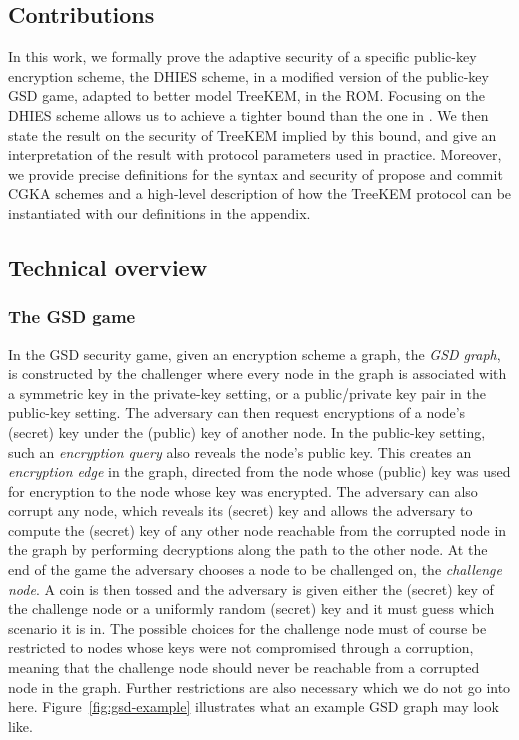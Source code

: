 \subsection{Contributions}

In this work, we formally prove the adaptive security of a specific public-key encryption scheme, the DHIES scheme, in a modified version of the public-key GSD game, adapted to better model TreeKEM, in the ROM. Focusing on the DHIES scheme allows us to achieve a tighter bound than the one in \cite{ttkem}. We then state the result on the security of TreeKEM implied by this bound, and give an interpretation of the result with protocol parameters used in practice.
Moreover, we provide precise definitions for the syntax and security of propose and commit CGKA schemes and a high-level description of how the TreeKEM protocol can be instantiated with our definitions in the appendix.

\subsection{Technical overview}

\subsubsection{The GSD game}

In the GSD security game, given an encryption scheme a graph, the \emph{GSD graph}, is constructed by the challenger where every node in the graph is associated with a symmetric key in the private-key setting, or a public/private key pair in the public-key setting. The adversary can then request encryptions of a node's (secret) key under the (public) key of another node. In the public-key setting, such an \emph{encryption query} also reveals the node's public key. This creates an \emph{encryption edge} in the graph, directed from the node whose (public) key was used for encryption to the node whose key was encrypted. The adversary can also corrupt any node, which reveals its (secret) key and allows the adversary to compute the (secret) key of any other node reachable from the corrupted node in the graph by performing decryptions along the path to the other node. At the end of the game the adversary chooses a node to be challenged on, the \emph{challenge node}. A coin is then tossed and the adversary is given either the (secret) key of the challenge node or a uniformly random (secret) key and it must guess which scenario it is in. The possible choices for the challenge node must of course be restricted to nodes whose keys were not compromised through a corruption, meaning that the challenge node should never be reachable from a corrupted node in the graph. Further restrictions are also necessary which we do not go into here. Figure~\ref{fig:gsd-example} illustrates what an example GSD graph may look like.

